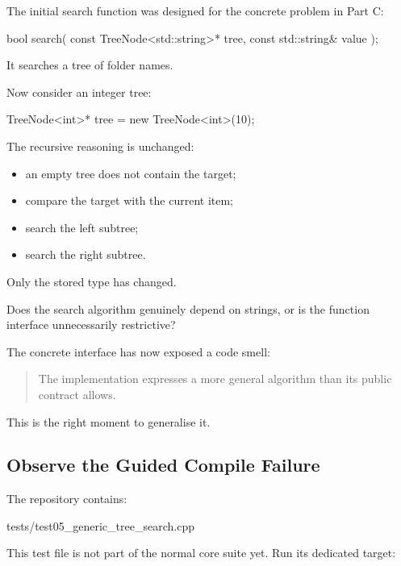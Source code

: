 \documentclass{csc2059practical}
\begin{document}
The initial search function was designed for the concrete problem in Part C:

\begin{cppcode}
bool search(
    const TreeNode<std::string>* tree,
    const std::string& value
);
\end{cppcode}

It searches a tree of folder names.

Now consider an integer tree:

\begin{cppcode}
TreeNode<int>* tree = new TreeNode<int>(10);
\end{cppcode}

The recursive reasoning is unchanged:

\begin{itemize}
    \item an empty tree does not contain the target;
    \item compare the target with the current item;
    \item search the left subtree;
    \item search the right subtree.
\end{itemize}

Only the stored type has changed.

\begin{engineeringquestion}
Does the search algorithm genuinely depend on strings, or is the function
interface unnecessarily restrictive?
\end{engineeringquestion}

The concrete interface has now exposed a code smell:

\begin{quote}
The implementation expresses a more general algorithm than its public
contract allows.
\end{quote}

This is the right moment to generalise it.

\subsection{Observe the Guided Compile Failure}

The repository contains:

\begin{terminal}
tests/test05_generic_tree_search.cpp
\end{terminal}

This test file is not part of the normal core suite yet. Run its dedicated
target:
\end{document}
